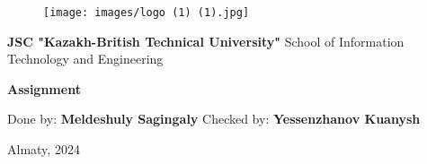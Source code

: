 \documentclass[a4paper]{article}
\begin{document}
\begin{center}
    \begin{figure}[H]
        \centering
        \texttt{[image: images/logo (1) (1).jpg]}
    \end{figure}

    \large{
        \textbf{JSC "Kazakh-British Technical University"}\break
    }
    \large{
        School of Information Technology and Engineering\break
    }\\
    
    \vspace{5cm} %

    \large{
        \textbf{Assignment}
    }\\

    \vspace{5cm} %

    \begin{flushright}
        Done by: \textbf{Meldeshuly Sagingaly}\break
        Checked by: \textbf{Yessenzhanov Kuanysh}
    \end{flushright}

    \vspace{1cm} %

\end{center}

\begin{center} 
    Almaty, 2024
\end{center}

\thispagestyle{empty}




\author{}
\date{}
\end{document}

